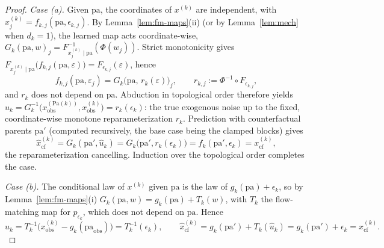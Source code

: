 \begin{proof}
\emph{Case (a).} Given $\mathrm{pa}$, the coordinates of $x^{(k)}$ are independent, with
$x^{(k)}_j = f_{k,j}(\mathrm{pa}, \epsilon_{k,j})$. By Lemma~\ref{lem:fm-maps}(ii) (or by
Lemma~\ref{lem:mech} when $d_k = 1$), the learned map acts coordinate-wise,
$G_k(\mathrm{pa}, w)_j = F^{-1}_{x^{(k)}_j \mid \mathrm{pa}}(\Phi(w_j))$. Strict
monotonicity gives $F_{x^{(k)}_j\mid \mathrm{pa}}\bigl(f_{k,j}(\mathrm{pa},\varepsilon)\bigr)
= F_{\epsilon_{k,j}}(\varepsilon)$, hence
\begin{equation}
\label{eq:reparam}
    f_{k,j}(\mathrm{pa}, \varepsilon_j)
  = G_k\bigl(\mathrm{pa},\, r_k(\varepsilon)\bigr)_j,
  \qquad r_{k,j} := \Phi^{-1} \circ F_{\epsilon_{k,j}},
\end{equation}
and $r_k$ does not depend on $\mathrm{pa}$. Abduction in topological order therefore yields
$\hat u_k = G_k^{-1}\bigl(x^{(\mathrm{Pa}(k))}_{\mathrm{obs}}, x^{(k)}_{\mathrm{obs}}\bigr)
= r_k(\epsilon_k)$: the true exogenous noise up to the fixed, coordinate-wise monotone
reparameterization $r_k$. Prediction with counterfactual parents $\mathrm{pa}'$ (computed
recursively, the base case being the clamped blocks) gives
\begin{equation}
  \hat x^{(k)}_{\mathrm{cf}} = G_k(\mathrm{pa}', \hat u_k)
  = G_k\bigl(\mathrm{pa}', r_k(\epsilon_k)\bigr)
  = f_k(\mathrm{pa}', \epsilon_k) = x^{(k)}_{\mathrm{cf}},
\end{equation}
the reparameterization cancelling. Induction over the topological order completes the case.

\emph{Case (b).} The conditional law of $x^{(k)}$ given $\mathrm{pa}$ is the law of
$g_k(\mathrm{pa}) + \epsilon_k$, so by Lemma~\ref{lem:fm-maps}(i)
$G_k(\mathrm{pa}, w) = g_k(\mathrm{pa}) + T_k(w)$, with $T_k$ the flow-matching map for
$p_{\epsilon_k}$, which does not depend on $\mathrm{pa}$. Hence
\begin{equation}
  \hat u_k = T_k^{-1}\bigl(x^{(k)}_{\mathrm{obs}} - g_k(\mathrm{pa}_{\mathrm{obs}})\bigr)
           = T_k^{-1}(\epsilon_k),
  \qquad
  \hat x^{(k)}_{\mathrm{cf}} = g_k(\mathrm{pa}') + T_k(\hat u_k)
           = g_k(\mathrm{pa}') + \epsilon_k = x^{(k)}_{\mathrm{cf}} .
\end{equation}
\end{proof}

